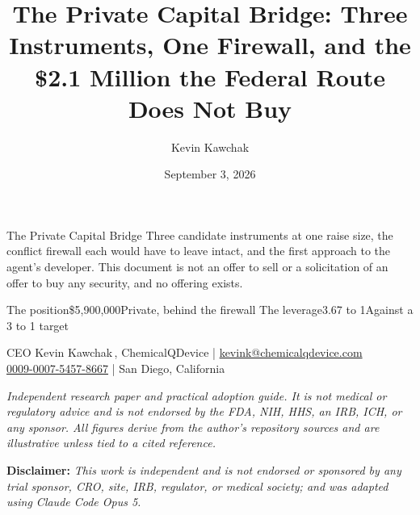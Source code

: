 \documentclass[11pt]{article}
\title{The Private Capital Bridge: Three Instruments, One Firewall, and the
\$2.1 Million the Federal Route Does Not Buy}
\author{Kevin Kawchak}
\date{September 3, 2026}
\begin{document}
\thispagestyle{plain}

%
{The Private Capital Bridge}%
{Three candidate instruments at one raise size, the conflict firewall each would
have to leave intact, and the first approach to the agent's developer. This
document is not an offer to sell or a solicitation of an offer to buy any
security, and no offering exists.}

\vspace{0.15em}

\begin{center}
 \enspace {} \enspace
{} \enspace {} \enspace
{}
\end{center}

\vspace{-0.15em}

%
{The position}{\$5,900,000}{Private, behind the firewall}%
{The leverage}{3.67 to 1}{Against a 3 to 1 target}

\vspace{-0.1em}
\apprule{0.9pt}

\begin{center}\small
CEO Kevin Kawchak\,, ChemicalQDevice \;|\;
\href{mailto:kevink@chemicalqdevice.com}{kevink@chemicalqdevice.com}\\
\href{https://orcid.org/0009-0007-5457-8667}{0009-0007-5457-8667} \;|\;
San Diego, California
\end{center}

\vspace{-0.25em}
\apprule{0.5pt}

\noindent\footnotesize\textit{Independent research paper and practical adoption
guide. It is not medical or regulatory advice and is not endorsed by the FDA,
NIH, HHS, an IRB, ICH, or any sponsor. All figures derive from the author's
repository sources and are illustrative unless tied to a cited
reference.}\normalsize\par

\vspace{0.12em}

\noindent\footnotesize\textbf{Disclaimer:} \textit{This work is independent and
is not endorsed or sponsored by any trial sponsor, CRO, site, IRB, regulator, or
medical society; and was adapted using Claude Code Opus 5.}\normalsize\par
\end{document}
